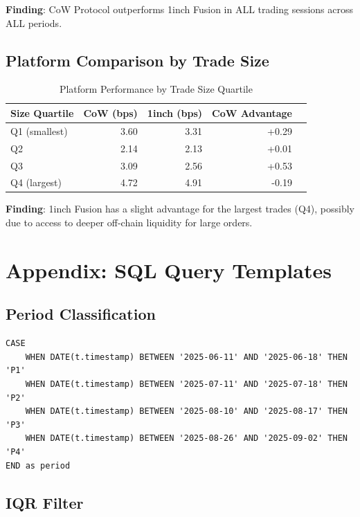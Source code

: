 \documentclass[11pt,a4paper]{article}
\begin{document}
\textbf{Finding}: CoW Protocol outperforms 1inch Fusion in ALL trading sessions across ALL periods.

\subsection{Platform Comparison by Trade Size}

\begin{table}[H]
\centering
\caption{Platform Performance by Trade Size Quartile}
\begin{tabular}{lrrrr}
\toprule
\textbf{Size Quartile} & \textbf{CoW (bps)} & \textbf{1inch (bps)} & \textbf{CoW Advantage} \\
\midrule
Q1 (smallest) & 3.60 & 3.31 & +0.29 \\
Q2 & 2.14 & 2.13 & +0.01 \\
Q3 & 3.09 & 2.56 & +0.53 \\
Q4 (largest) & 4.72 & 4.91 & -0.19 \\
\bottomrule
\end{tabular}
\end{table}

\textbf{Finding}: 1inch Fusion has a slight advantage for the largest trades (Q4), possibly due to access to deeper off-chain liquidity for large orders.

\section{Appendix: SQL Query Templates}

\subsection{Period Classification}

\begin{verbatim}
CASE
    WHEN DATE(t.timestamp) BETWEEN '2025-06-11' AND '2025-06-18' THEN 'P1'
    WHEN DATE(t.timestamp) BETWEEN '2025-07-11' AND '2025-07-18' THEN 'P2'
    WHEN DATE(t.timestamp) BETWEEN '2025-08-10' AND '2025-08-17' THEN 'P3'
    WHEN DATE(t.timestamp) BETWEEN '2025-08-26' AND '2025-09-02' THEN 'P4'
END as period
\end{verbatim}

\subsection{IQR Filter}
\end{document}

